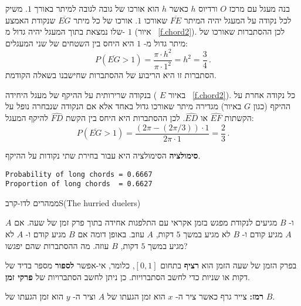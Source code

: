 בנה מעגל עם מרכז
$O$
ורדיוס 
$h$
כאשר 
$h$
הוא אורכו של גובה לגובה למיתר באורך 
$1$.
משיק לכל נקודה על המעגל יהיה המיתר
$\overline{FE}$
שאורכו 
$1$.
אורכו של כל מיתר
$\overline{EG}$
שנקודת האמצע שלו נמצאת בתוך המעגל יהיה גדול מ-%
$1$
(איור%
~\ref{f.chord2}).
לכן ההסתברות שאורכו של מיתר גדול מ-%
$1$
היא היחס בין השטחים של שני המעגלים:
\[
P(\overline{EG}>1)=\frac{\pi \cdot h^2}{\pi \cdot 1^2}=h^2=\frac{3}{4}\,.
\]
הסתברות זו היא הריבוע של ההסתברות שחישבנו בשאלה הקודמת.

בנקודה שרירותית על ההיקף של מעגל היחידה (%
$E$
באיור%
~\ref{f.chord2}).
כל נקודה אחרת על ההיקף (כגון 
$G$
באיור) מגדירה מיתר שאורכו גדול באחד אלא אם הנקודה שנבחרה נופל על הקשתות
$\widehat{EF}$
או
$\widehat{ED}$.
לכן ההסתברות היא היחס בין הקשת
$\widehat{FD}$
להיקף המעגל:
\[
P(\overline{EG}>1)=\frac{(2\pi-(2\pi/3))\cdot 1}{2\pi \cdot 1}=\frac{2}{3}\,.
\]

\textbf{סימולציה}
הסימולציה היא עבור בחירת שתי נקודות על ההיקף.
\begin{verbatim}
Probability of long chords = 0.6667
Proportion of long chords  = 0.6627
\end{verbatim}


\begin{prob}{ממהרים לדו-קרב}{S}{(The hurried duelers)}

$A$
ו-%
$B$
מגיעים לנקודת מפגש בזמן אקראי עם התלפגות אחידה בתוך פרק זמן של שעה. אם 
$A$
מגיע קודם ו-%
$B$
לא מגיע במשך 
$5$
דקות, 
$A$
עוזב. באופן דומה אם 
$B$
מגיע קודם ו-%
$A$
לא מגיע במשך 
$5$
דקות,
$B$
עוזה. מה ההסתברות שהם יפגשו?

בפרק הזמן של שעה הזמן הוא
\textbf{רציף}
בתחום
$[0,1]$,
כלומר,
אי-אפשר 
\textbf{לספור}
מספר בדיד של דקות או שניות כדי לחשב הסתברויות. כן ניתן לחשב הסתברויות של 
\textbf{פרקי זמן}.

\textbf{רמז:}
צייר גרף כאשר ציר ה-%
$x$
הוא זמן הגעתו של
$A$
וציר ה-%
$y$
הוא זמן הגעתו של 
$B$.
\end{prob}

\solution{}

